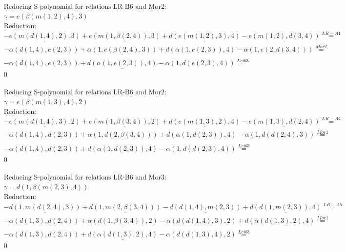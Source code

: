 \documentclass[11pt]{amsart}
\begin{document}
\begin{align*} 
& \text{Reducing S-polynomial for relations LR-B6 and Mor2:} \\ 
& \gamma = e(\beta(m(1,2),4),3) \\ 
& \text{Reduction}: \\& - \underline{e(m(d(1,4),2),3)} + \underline{e(m(1,\beta(2,4)),3)} + \underline{d(e(m(1,2),3),4)} - \underline{e(m(1,2),d(3,4))} \stackrel{ LR-A1 }{=}  \\ 
& - \alpha(d(1,4),e(2,3)) + \underline{\alpha(1,e(\beta(2,4),3))} + d(\alpha(1,e(2,3)),4) - \alpha(1,e(2,d(3,4))) \stackrel{ Mor2 }{=}  \\ 
& - \alpha(d(1,4),e(2,3)) + \underline{d(\alpha(1,e(2,3)),4)} - \alpha(1,d(e(2,3),4)) \stackrel{ Leib3 }{=}  \\ 
&0\\ 
\end{align*} 
 
\begin{align*} 
& \text{Reducing S-polynomial for relations LR-B6 and Mor2:} \\ 
& \gamma = e(\beta(m(1,3),4),2) \\ 
& \text{Reduction}: \\& - \underline{e(m(d(1,4),3),2)} + \underline{e(m(1,\beta(3,4)),2)} + \underline{d(e(m(1,3),2),4)} - \underline{e(m(1,3),d(2,4))} \stackrel{ LR-A4 }{=}  \\ 
& - \alpha(d(1,4),d(2,3)) + \underline{\alpha(1,d(2,\beta(3,4)))} + d(\alpha(1,d(2,3)),4) - \alpha(1,d(d(2,4),3)) \stackrel{ Mor1 }{=}  \\ 
& - \alpha(d(1,4),d(2,3)) + \underline{d(\alpha(1,d(2,3)),4)} - \alpha(1,d(d(2,3),4)) \stackrel{ Leib3 }{=}  \\ 
&0\\ 
\end{align*} 
 
\begin{align*} 
& \text{Reducing S-polynomial for relations LR-B6 and Mor3:} \\ 
& \gamma = d(1,\beta(m(2,3),4)) \\ 
& \text{Reduction}: \\& - \underline{d(1,m(d(2,4),3))} + \underline{d(1,m(2,\beta(3,4)))} - \underline{d(d(1,4),m(2,3))} + \underline{d(d(1,m(2,3)),4)} \stackrel{ LR-A5 }{=}  \\ 
& - \alpha(d(1,3),d(2,4)) + \underline{\alpha(d(1,\beta(3,4)),2)} - \alpha(d(d(1,4),3),2) + d(\alpha(d(1,3),2),4) \stackrel{ Mor1 }{=}  \\ 
& - \alpha(d(1,3),d(2,4)) + \underline{d(\alpha(d(1,3),2),4)} - \alpha(d(d(1,3),4),2) \stackrel{ Leib3 }{=}  \\ 
&0\\ 
\end{align*} 
 
\end{document}
